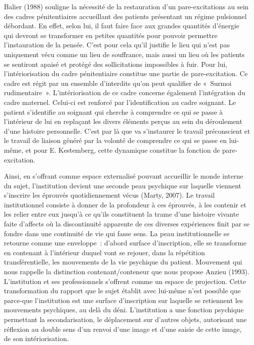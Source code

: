 \documentclass[12pt, a4paper]{book}
\begin{document}
\begin{spacing}{1.5}
Balier (1988) souligne la nécessité de la restauration d'un pare-excitations au sein des cadres pénitentiaires accueillant des patients présentant un régime pulsionnel débordant. En effet, selon lui, il faut faire face aux grandes quantités d'énergie qui devront se transformer en petites quantités pour pouvoir permettre l'instauration de la pensée. C'est pour cela qu'il justifie le lieu qui n'est pas uniquement vécu comme un lieu de souffrance, mais aussi un lieu où les patients se sentiront apaisé et protégé des sollicitations impossibles à fuir. Pour lui, l'intériorisation du cadre pénitentiaire constitue une partie de pare-excitation. Ce cadre est régit par un ensemble d'interdits qu'on peut qualifier de « Surmoi rudimentaire ». L'intériorisation de ce cadre concerne également l'intégration du cadre maternel. Celui-ci est renforcé par l'identification au cadre soignant. Le patient s'identifie au soignant qui cherche à comprendre ce qui se passe à l'intérieur de lui en replaçant les divers éléments perçus au sein du déroulement d'une histoire personnelle. C'est par là que va s'instaurer le travail préconscient et le travail de liaison généré par la volonté de comprendre ce qui se passe en lui-même, et pour E. Kestemberg, cette dynamique constitue la fonction de pare-excitation.

Ainsi, en s'offrant comme espace externalisé pouvant accueillir le monde interne du sujet, l'institution devient une seconde peau psychique sur laquelle viennent s'inscrire les éprouvés quotidiennement vécus (Marty, 2007). Le travail institutionnel consiste à donner de la profondeur à ces éprouvés, à les contenir et les relier entre eux jusqu'à ce qu'ils constituent la trame d'une histoire vivante faite d'affects où la discontinuité apparente de ces diverses expériences finit par se fondre dans une continuité de vie qui fasse sens. La peau institutionnelle se retourne comme une enveloppe : d'abord surface d'inscription, elle se transforme en contenant à l'intérieur duquel vont se rejouer, dans la répétition transférentielle, les mouvements de la vie psychique du patient. Mouvement qui nous rappelle la distinction contenant/conteneur que nous propose Anzieu (1993). L'institution et ses professionnels s'offrent comme un espace de projection. Cette transformation du rapport que le sujet établit avec lui-même n'est possible que parce-que l'institution est une surface d'inscription sur laquelle se retiennent les mouvements psychiques, au delà du déni. L'institution a une fonction psychique permettant la secondarisation, le déplacement sur d'autres objets, autorisant une réflexion au double sens d'un renvoi d'une image et d'une saisie de cette image, de son intériorisation. 


\end{spacing}
\end{document}

